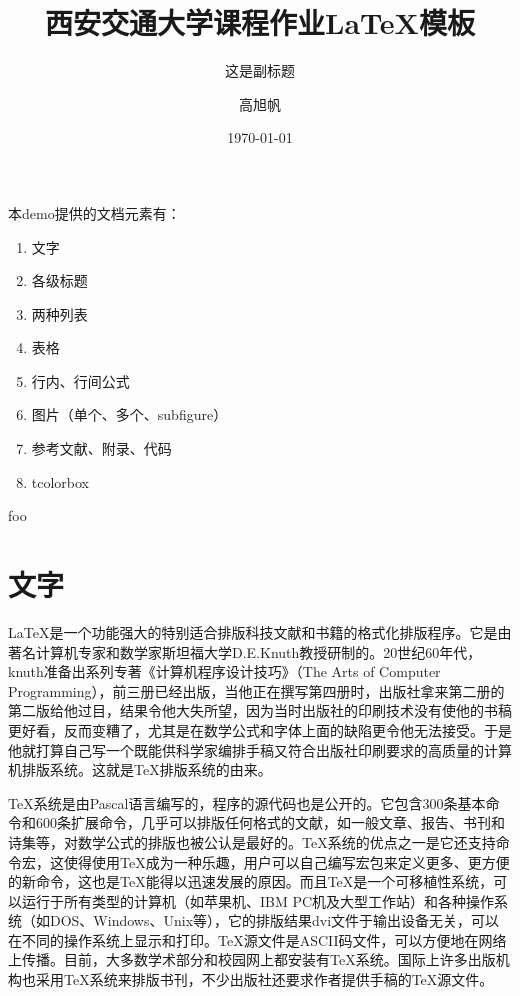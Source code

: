 \documentclass[UTF8,12pt,a4paper]{article}
\title{西安交通大学课程作业\LaTeX 模板} %
\author{高旭帆}  %
\date{\today}
\subtitle{这是副标题}
\begin{document}



\noindent 本demo提供的文档元素有：
\begin{enumerate}
	\item 文字
	\item 各级标题
	\item 两种列表
	\item 表格
	\item 行内、行间公式
	\item 图片（单个、多个、subfigure）
	\item 参考文献、附录、代码
	\item tcolorbox
\end{enumerate}

\ifcsname foo\endcsname
{}%
\else
{}%
\fi

\section{文字}
\LaTeX 是一个功能强大的特别适合排版科技文献和书籍的格式化排版程序。它是由著名计算机专家和数学家斯坦福大学D.E.Knuth教授研制的。20世纪60年代，knuth准备出系列专著《计算机程序设计技巧》（The Arts of Computer Programming），前三册已经出版，当他正在撰写第四册时，出版社拿来第二册的第二版给他过目，结果令他大失所望，因为当时出版社的印刷技术没有使他的书稿更好看，反而变糟了，尤其是在数学公式和字体上面的缺陷更令他无法接受。于是他就打算自己写一个既能供科学家编排手稿又符合出版社印刷要求的高质量的计算机排版系统。这就是TeX排版系统的由来。

TeX系统是由Pascal语言编写的，程序的源代码也是公开的。它包含300条基本命令和600条扩展命令，几乎可以排版任何格式的文献，如一般文章、报告、书刊和诗集等，对数学公式的排版也被公认是最好的。TeX系统的优点之一是它还支持命令宏，这使得使用TeX成为一种乐趣，用户可以自己编写宏包来定义更多、更方便的新命令，这也是TeX能得以迅速发展的原因。而且TeX是一个可移植性系统，可以运行于所有类型的计算机（如苹果机、IBM PC机及大型工作站）和各种操作系统（如DOS、Windows、Unix等），它的排版结果dvi文件于输出设备无关，可以在不同的操作系统上显示和打印。TeX源文件是ASCII码文件，可以方便地在网络上传播。目前，大多数学术部分和校园网上都安装有TeX系统。国际上许多出版机构也采用TeX系统来排版书刊，不少出版社还要求作者提供手稿的TeX源文件。
\end{document}
